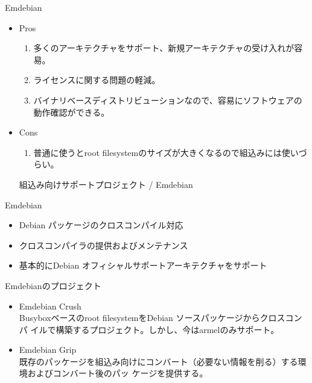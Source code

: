 \begin{frame}{Emdebian}
\begin{itemize}
\item Pros

  \begin{enumerate}
  \item 多くのアーキテクチャをサポート、新規アーキテクチャの受け入れが容易。
  \item ライセンスに関する問題の軽減。
  \item バイナリベースディストリビューションなので、容易にソフトウェアの動作確認ができる。
  \end{enumerate}

\item Cons
  \begin{enumerate}
  \item 普通に使うとroot filesystemのサイズが大きくなるので組込みには使いづらい。
  \end{enumerate}

組込み向けサポートプロジェクト / Emdebian
\end{itemize}

\end{frame}

\begin{frame}{Emdebian}
\begin{itemize}
\item Debian パッケージのクロスコンパイル対応
\item クロスコンパイラの提供およびメンテナンス
\item 基本的にDebian オフィシャルサポートアーキテクチャをサポート
\end{itemize}
\end{frame}

\begin{frame}{Emdebianのプロジェクト}
\begin{itemize}
\item Emdebian Crush\\
Busyboxベースのroot filesystemをDebian ソースパッケージからクロスコンパ
 イルで構築するプロジェクト。しかし、今はarmelのみサポート。
\item Emdebian Grip\\
既存のパッケージを組込み向けにコンバート（必要ない情報を削る）する環境およびコンバート後のパッ
 ケージを提供する。
\end{itemize}
\end{frame}



